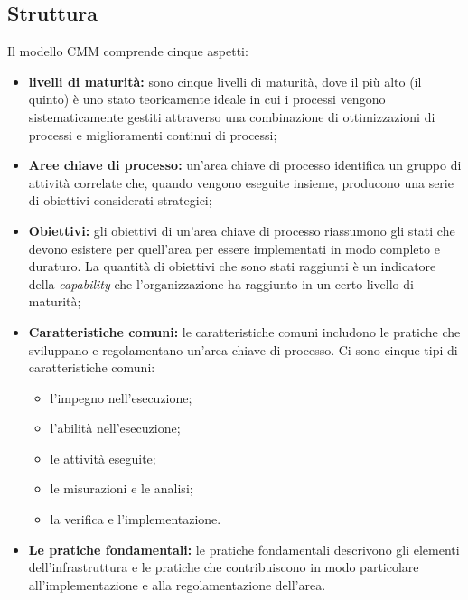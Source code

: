 \subsection{Struttura}
Il modello CMM comprende cinque aspetti:
\begin{itemize}
\item \textbf{livelli di maturità:} sono cinque livelli di maturità, dove il più alto (il quinto) è uno stato teoricamente ideale in cui i processi vengono sistematicamente gestiti attraverso una combinazione di ottimizzazioni di processi e miglioramenti continui di processi;
\item \textbf{Aree chiave di processo:} un'area chiave di processo identifica un gruppo di attività correlate che, quando vengono eseguite insieme, producono una serie di obiettivi considerati strategici;
\item \textbf{Obiettivi:} gli obiettivi di un'area chiave di processo riassumono gli stati che devono esistere per quell'area  per essere implementati in modo completo e duraturo. La quantità di obiettivi che sono stati raggiunti è un indicatore della \textit{capability} che l'organizzazione ha raggiunto in un certo livello di maturità;
\item \textbf{Caratteristiche comuni:} le caratteristiche comuni includono le pratiche che sviluppano e regolamentano un'area chiave di processo. Ci sono cinque tipi di caratteristiche comuni:
\begin{itemize}
\item l'impegno nell'esecuzione;
\item l'abilità nell'esecuzione;
\item le attività eseguite;
\item le misurazioni e le analisi;
\item la verifica e l'implementazione.
\end{itemize}
\item \textbf{Le pratiche fondamentali:} le pratiche fondamentali descrivono gli elementi dell'infrastruttura e le pratiche che contribuiscono in modo particolare all'implementazione e alla regolamentazione dell'area.
\end{itemize}
